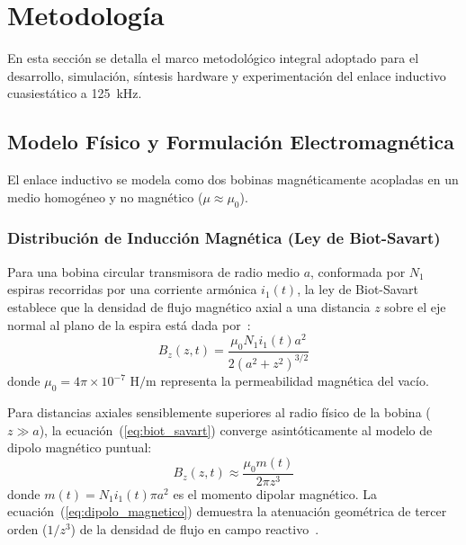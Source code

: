 \section{Metodología}
\label{sec:metodologia}

En esta sección se detalla el marco metodológico integral adoptado para el desarrollo, simulación, síntesis hardware y experimentación del enlace inductivo cuasiestático a \SI{125}{\kilo\hertz}.

\subsection{Modelo Físico y Formulación Electromagnética}
\label{subsec:modelo_fisico}

El enlace inductivo se modela como dos bobinas magnéticamente acopladas en un medio homogéneo y no magnético ($\mu \approx \mu_0$).

\subsubsection{Distribución de Inducción Magnética (Ley de Biot-Savart)}
Para una bobina circular transmisora de radio medio $a$, conformada por $N_1$ espiras recorridas por una corriente armónica $i_1(t)$, la ley de Biot-Savart establece que la densidad de flujo magnético axial a una distancia $z$ sobre el eje normal al plano de la espira está dada por~\cite{hayt2012electromagnetics}:
\begin{equation}
    B_z(z, t) = \frac{\mu_0 N_1 i_1(t) a^2}{2 (a^2 + z^2)^{3/2}}
    \label{eq:biot_savart}
\end{equation}
donde $\mu_0 = 4\pi \times 10^{-7}\text{ H/m}$ representa la permeabilidad magnética del vacío.

Para distancias axiales sensiblemente superiores al radio físico de la bobina ($z \gg a$), la ecuación~(\ref{eq:biot_savart}) converge asintóticamente al modelo de dipolo magnético puntual:
\begin{equation}
    B_z(z, t) \approx \frac{\mu_0 m(t)}{2\pi z^3}
    \label{eq:dipolo_magnetico}
\end{equation}
donde $m(t) = N_1 i_1(t) \pi a^2$ es el momento dipolar magnético. La ecuación~(\ref{eq:dipolo_magnetico}) demuestra la atenuación geométrica de tercer orden ($1/z^3$) de la densidad de flujo en campo reactivo~\cite{finkenzeller2010rfid}.

